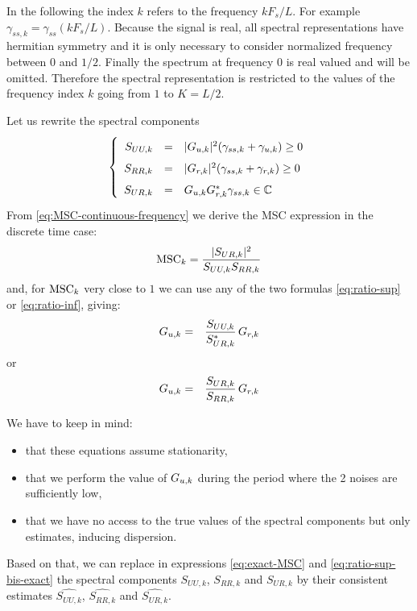  In the following the index $k$ refers to the frequency $kF_{s}/L$. For example $\gamma_{ss,k}=\gamma_{ss}(kF_{s}/L)$. Because the signal is real, all spectral representations have hermitian symmetry and it is only necessary to consider normalized frequency between $0$ and $1/2$. Finally the spectrum at frequency 0 is real valued and will be omitted. Therefore the spectral representation is restricted to the values of the frequency index $k$ going from $1$ to $K=L/2$. 

Let us rewrite the spectral components
\begin{eqnarray}
\label{eq:spectral-model-dicrete}
\left\{
\renewcommand\arraystretch{1.6}
\begin{array}{rcl}
S_{UU,k}&=&|G_{\ut,k}|^{2} (\gamma_{ss,k}+\gamma_{\ut,k})\geq 0
\\
S_{RR,k}&=&|G_{\rf,k}|^{2} (\gamma_{ss,k}+\gamma_{\rf,k})\geq 0
\\
S_{UR,k}&=&G_{\ut,k}G^{*}_{\rf,k}\gamma_{ss,k}\in\mathbb{C}
\end{array}
\right.
\end{eqnarray}
From \eqref{eq:MSC-continuous-frequency} we derive the MSC expression in the discrete time case:
\begin{eqnarray}
 \label{eq:exact-MSC}
\mathrm{MSC}_{k} = \frac{|{S_{UR,k}}|^{2}}{{S_{UU,k}}{S_{RR,k}}}
\end{eqnarray}
and, for $\mathrm{MSC}_{k}$ very close to $1$ we can use any of the two formulas \eqref{eq:ratio-sup} or \eqref{eq:ratio-inf}, giving:
\begin{eqnarray}
\label{eq:ratio-sup-bis-exact}
{G_{{u},k}}&=&
\frac{{S_{UU,k}}}{{S^*_{UR,k}}}\,G_{{r},k}
\end{eqnarray}
or
\begin{eqnarray}
\label{eq:ratio-inf-bis-exact}
{G_{{u},k}}&=&
\frac{{S_{UR,k}}}{{S_{RR,k}}}\,G_{{r},k}
\end{eqnarray}

We have to keep in mind:
\begin{itemize}
\item
that these equations assume stationarity,
\item
that we perform the value of $G_{{u},k}$ during the period where the 2 noises are sufficiently low,
\item
that we have no access to the true values of the spectral components but only estimates, inducing dispersion. 
\end{itemize}

Based on that, we can replace in expressions \eqref{eq:exact-MSC} and \eqref{eq:ratio-sup-bis-exact} the spectral components $S_{UU,k}$, $S_{RR,k}$ and $S_{UR,k}$ by their consistent estimates $\widehat{S_{UU,k}}$, $\widehat{S_{RR,k}}$ and $\widehat{S_{UR,k}}$.


